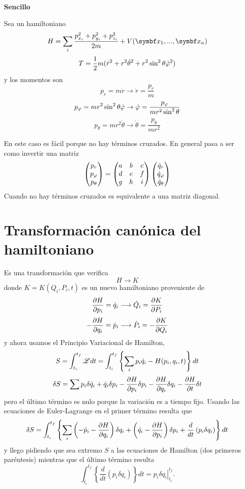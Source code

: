 \documentclass[10pt,oneside]{CBFT_book}
\begin{document}
\begin{ejemplo}{\bf Sencillo}

Sea un hamiltoniano
\[
	H = \sum_i \frac{ p_{x_i}^2 + p_{y_i}^2 + p_{z_i}^2 }{2m} + V( \vb{x}_1,...,\vb{x}_n )
\]
\[
	T = \frac 1 2 m ( \dot{r}^2 + r^2 \dot{\theta}^2 + r^2 \sin^2 \theta \dot{\varphi}^2 )
\]
y los momentos son
\[
	p_r = m \dot{r} \to \dot{r} = \frac{p_r}{m}
\]
\[
	p_\varphi = m r^2 \sin^2 \theta \dot{\varphi} \to \dot{\varphi} = \frac{p_\varphi}{m r^2 \sin^2 \theta}
\]
\[
	p_\theta = m r^2 \dot{\theta} \to \dot{\theta} = \frac{p_\theta}{m r^2}
\]

En este caso es fácil porque no hay términos cruzados. En general pasa a ser como invertir una matriz
\[
	\begin{pmatrix}
	p_r \\
	p_\varphi \\
	p_\theta
	\end{pmatrix} =
	\begin{pmatrix}
	 a & b & c \\
	 d & e & f \\
	 g & h & i 
	\end{pmatrix}
	\begin{pmatrix}
	\dot{q}_r \\
	\dot{q}_\varphi \\
	\dot{q}_\theta
	\end{pmatrix}
\]
Cuando no hay términos cruzados es equivalente a una matriz diagonal.
\end{ejemplo}


\section{Transformación canónica del hamiltoniano}

Es una transformación que verifica
\[
	H \longrightarrow K
\]
donde $K=K(Q_i,P_i,t)$ es un nuevo hamiltoniano proveniente de
\[
	\frac{\partial^{\hspace{-0.05em}} {H}}{\partial {p_i}^{\hspace{-0.05em}}} = \dot{q}_i \longrightarrow \dot{Q}_i = \frac{\partial^{\hspace{-0.05em}} {K}}{\partial {P_i}^{\hspace{-0.05em}}}
\]
\[
	-\frac{\partial^{\hspace{-0.05em}} {H}}{\partial {q_i}^{\hspace{-0.05em}}} = \dot{p}_i \longrightarrow \dot{P}_i = -\frac{\partial^{\hspace{-0.05em}} {K}}{\partial {Q_i}^{\hspace{-0.05em}}}
\]
y ahora usamos el Principio Variacional de Hamilton,
\[
	S = \int_{t_i}^{t_f} \mathscr{L} dt = \int_{t_i}^{t_f}  \left\{ \sum_i p_i \dot{q}_i - H(p_i,q_i,t) \right\} dt
\]
\[
	\delta S = \sum p_i \delta \dot{q}_i +  \dot{q}_i \delta p_i  - \frac{\partial^{\hspace{-0.05em}} {H}}{\partial {p_i}^{\hspace{-0.05em}}}\delta p_i 
	-\frac{\partial^{\hspace{-0.05em}} {H}}{\partial {q_i}^{\hspace{-0.05em}}}\delta q_i  - \frac{\partial^{\hspace{-0.05em}} {H}}{\partial {t}^{\hspace{-0.05em}}}\delta t
\]
pero el último término es nulo porque la variación es a tiempo fijo.
Usando las ecuaciones de Euler-Lagrange en el primer término resulta que 
\[
	\delta S = \int_{t_i}^{t_f}  \left\{ \sum_i \left(-\dot{p}_i -\frac{\partial^{\hspace{-0.05em}} {H}}{\partial {q_i}^{\hspace{-0.05em}}} \right) \delta q_i +
	\left( \dot{q}_i - \frac{\partial^{\hspace{-0.05em}} {H}}{\partial {p_i}^{\hspace{-0.05em}}} \right) \delta p_i + \frac{d}{dt}\left( p_i \delta q_i \right) \right\} dt
\]
y llego pidiendo que sea extremo $S$ a las ecuaciones de Hamilton (dos primeros paréntesis) mientras que el 
último término resulta 
\[
	\int_{t_i}^{t_f}  \left\{ \frac{d}{dt}\left( p_i \delta q_i \right) \right\} dt =
	\left. p_i \delta q_i \right|_{t_i}^{t_f}.
\]
\end{document}

